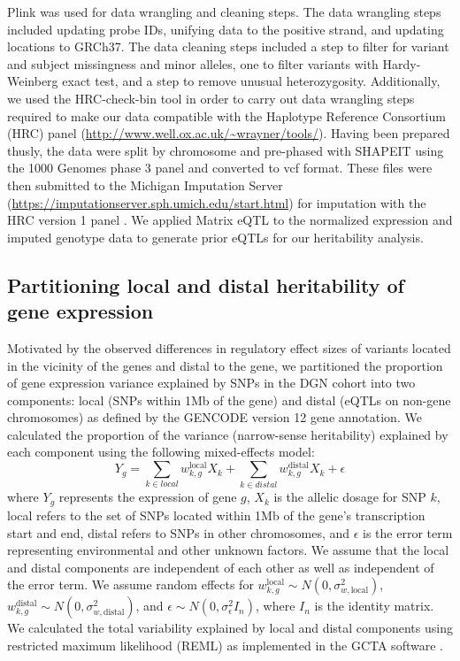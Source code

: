 \documentclass[10pt,letterpaper]{article}
\begin{document}
Plink \cite{chang2015second} was used for data wrangling and cleaning steps. The data wrangling steps included updating probe IDs, unifying data to the positive strand, and updating locations to GRCh37. The data cleaning steps included a step to filter for variant and subject missingness and minor alleles, one to filter variants with Hardy-Weinberg exact test, and a step to remove unusual heterozygosity. Additionally, we used the HRC-check-bin tool in order to carry out data wrangling steps required to make our data compatible with the Haplotype Reference Consortium (HRC) panel (\url{http://www.well.ox.ac.uk/~wrayner/tools/}). Having been prepared thusly, the data were split by chromosome and pre-phased with SHAPEIT \cite{delaneau2012linear} using the 1000 Genomes phase 3 panel and converted to vcf format. These files were then submitted to the Michigan Imputation Server (\url{https://imputationserver.sph.umich.edu/start.html}) \cite{Howie_2012,Fuchsberger_2014} for imputation with the HRC version 1 panel \cite{mccarthy2015reference}.  We applied Matrix eQTL \cite{shabalin2012matrix} to the normalized expression and imputed genotype data to generate prior eQTLs for our heritability analysis.

\subsection*{Partitioning local and distal heritability of gene
expression}\label{partitioning-local-and-distal-heritability-of-gene-expression}

Motivated by the observed differences in regulatory effect sizes of variants located in the vicinity of the genes and distal to the gene,
we partitioned the proportion of gene expression variance explained by
SNPs in the DGN cohort into two components: local (SNPs within 1Mb of
the gene) and distal (eQTLs on non-gene chromosomes) as defined by the
GENCODE \cite{Harrow_2012} version 12 gene annotation. We calculated the
proportion of the variance (narrow-sense heritability) explained by each
component using the following mixed-effects model:
%
\[ Y_g = \sum_{k  \in local}w^\text{local}_{k,g} X_k + \sum_{k  \in distal}w^\text{distal}_{k,g} X_k + \epsilon \]
%
where $Y_g$ represents the expression of gene $g$, $X_k$ is the allelic dosage for SNP $k$, local refers to the set of SNPs located within 1Mb of the gene's transcription start and end, distal refers to SNPs in other chromosomes, and $\epsilon$ is the error term representing environmental and other unknown factors. We assume that the local and distal components are independent of each other as well as independent of the error term.
We assume random effects for \(w^\text{local}_{k,g} \sim N(0, \sigma^2_{w,\text{local}})\), \(w^\text{distal}_{k,g} \sim N(0, \sigma^2_{w,\text{distal}})\), and
\(\epsilon \sim N(0, \sigma^2_{\epsilon} I_n)\), where \(I_n\) is the
identity matrix. We calculated the total variability explained by local
and distal components using restricted
maximum likelihood (REML) as implemented in the GCTA software \cite{Yang_2011}. 
\end{document}
